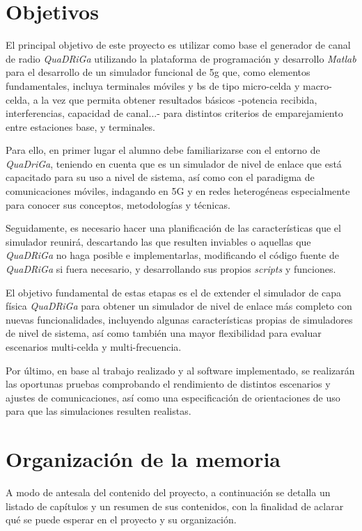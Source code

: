 \section{Objetivos}

El principal objetivo de este proyecto es utilizar como base el generador de canal de radio \textit{QuaDRiGa} utilizando la plataforma de programación y desarrollo \textit{Matlab} para el desarrollo de un simulador funcional de \acs{5g} que, como elementos fundamentales, incluya terminales móviles y \ac{bs} de tipo micro-celda y macro-celda, a la vez que permita obtener resultados básicos -potencia recibida, interferencias, capacidad de canal...- para distintos criterios de emparejamiento entre estaciones base, y terminales.

Para ello, en primer lugar el alumno debe familiarizarse con el entorno de \textit{QuaDriGa}, teniendo en cuenta que es un simulador de nivel de enlace que está capacitado para su uso a nivel de sistema, así como con el paradigma de comunicaciones móviles, indagando en 5G y en redes heterogéneas especialmente para conocer sus conceptos, metodologías y técnicas.

Seguidamente, es necesario hacer una planificación de las características que el simulador reunirá, descartando las que resulten inviables o aquellas que \textit{QuaDRiGa} no haga posible e implementarlas, modificando el código fuente de \textit{QuaDRiGa} si fuera necesario, y desarrollando sus propios \textit{scripts} y funciones.

El objetivo fundamental de estas etapas es el de extender el simulador de capa física \textit{QuaDRiGa} para obtener un simulador de nivel de enlace más completo con nuevas funcionalidades, incluyendo algunas características propias de simuladores de nivel de sistema, así como también una mayor flexibilidad para evaluar escenarios multi-celda y multi-frecuencia.

Por último, en base al trabajo realizado y al software implementado, se realizarán las oportunas pruebas comprobando el rendimiento de distintos escenarios y ajustes de comunicaciones, así como una especificación de orientaciones de uso para que las simulaciones resulten realistas.

\section{Organización de la memoria}

A modo de antesala del contenido del proyecto, a continuación se detalla un listado de capítulos y un resumen de sus contenidos, con la finalidad de aclarar qué se puede esperar en el proyecto y su organización.

